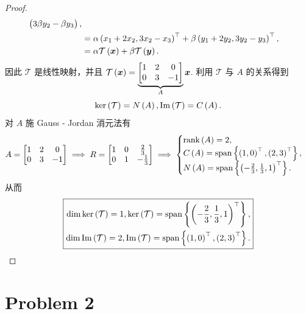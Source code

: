 \begin{proof}
\[\begin{aligned}
\begin{pmatrix}
        3 \beta y_2 - \beta y_3 \\
    \end{pmatrix}, \\
    &= \alpha \left(x_1 + 2x_2, 3x_2 - x_3\right)^\top + \beta \left(y_1 + 2y_2, 3y_2 - y_3\right)^\top, \\
    &= \alpha \mathcal{T} \left(\boldsymbol{x}\right) + \beta \mathcal{T} \left(\boldsymbol{y}\right).
\end{aligned}
\]
因此 $\mathcal{T}$ 是线性映射，并且 $\mathcal{T} \left(\boldsymbol{x}\right) = \underbrace{\begin{bmatrix}
    1 & 2 & 0 \\
    0 & 3 & -1 \\
\end{bmatrix}}_{A} \boldsymbol{x}$. 利用 $\mathcal{T}$ 与 $A$ 的关系得到 \[\ker \left(\mathcal{T}\right) = N \left(A\right), \mathrm{Im} \left(\mathcal{T}\right) = C \left(A\right).\]
对 $A$ 施 Gauss - Jordan 消元法有 \[
A = \begin{bmatrix}
    1 & 2 & 0 \\
    0 & 3 & -1 \\
\end{bmatrix} \implies R = \begin{bmatrix}
    1 & 0 & \frac{2}{3} \\
    0 & 1 & -\frac{1}{3} \\
\end{bmatrix} \implies \begin{cases}
    \mathrm{rank} \left(A\right) = 2, \\
    C \left(A\right) = \mathrm{span} \left\{\left(1, 0\right)^\top, \left(2, 3\right)^\top\right\}, \\
    N \left(A\right) = \mathrm{span} \left\{\left(-\frac{2}{3}, \frac{1}{3}, 1\right)^\top\right\}. \\
\end{cases}
\]
从而
\[
\boxed{
    \begin{aligned}
        \dim \ker \left(\mathcal{T}\right) = 1, \ker \left(\mathcal{T}\right) = \mathrm{span} \left\{\left(-\frac{2}{3}, \frac{1}{3}, 1\right)^\top\right\}, \\
        \dim \mathrm{Im} \left(\mathcal{T}\right) = 2, \mathrm{Im} \left(\mathcal{T}\right) = \mathrm{span} \left\{\left(1, 0\right)^\top, \left(2, 3\right)^\top\right\}. \\
    \end{aligned}
}
\]
\end{proof}

\section*{Problem 2}

